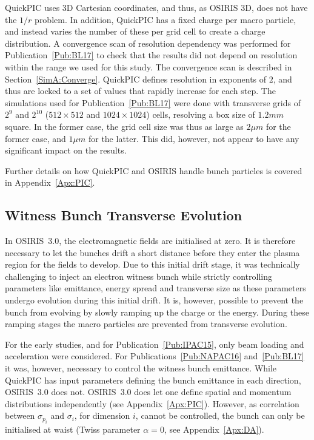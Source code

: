 QuickPIC uses 3D Cartesian coordinates, and thus, as OSIRIS 3D, does not have the $1/r$ problem.
In addition, QuickPIC has a fixed charge per macro particle, and instead varies the number of these per grid cell to create a charge distribution.
A convergence scan of resolution dependency was performed for Publication~\ref{Pub:BL17} to check that the results did not depend on resolution within the range we used for this study. The convergence scan is described in Section~\ref{SimA:Converge}.
QuickPIC defines resolution in exponents of $2$, and thus are locked to a set of values that rapidly increase for each step.
The simulations used for Publication~\ref{Pub:BL17} were done with transverse grids of $2^{9}$ and $2^{10}$ ($512 \times 512$ and $1024 \times 1024$) cells, resolving a box size of $1.2\unit{mm}$ square.
In the former case, the grid cell size was thus as large as $2\unit{\mu m}$ for the former case, and $1\unit{\mu m}$ for the latter.
This did, however, not appear to have any significant impact on the results.

Further details on how QuickPIC and OSIRIS handle bunch particles is covered in Appendix~\ref{Apx:PIC}.

\subsection{Witness Bunch Transverse Evolution}
\label{Sim:EBeam:TEvol}

In OSIRIS~3.0, the electromagnetic fields are initialised at zero.
It is therefore necessary to let the bunches drift a short distance before they enter the plasma region for the fields to develop.
Due to this initial drift stage, it was technically challenging to inject an electron witness bunch while strictly controlling parameters like emittance, energy spread and transverse size as these parameters undergo evolution during this initial drift.
It is, however, possible to prevent the bunch from evolving by slowly ramping up the charge or the energy.
During these ramping stages the macro particles are prevented from transverse evolution.

For the early studies, and for Publication~\ref{Pub:IPAC15}, only beam loading and acceleration were considered.
For Publications~\ref{Pub:NAPAC16} and~\ref{Pub:BL17} it was, however, necessary to control the witness bunch emittance.
While QuickPIC has input parameters defining the bunch emittance in each direction, OSIRIS~3.0 does not.
OSIRIS~3.0 does let one define spatial and momentum distributions independently (see Appendix~\ref{Apx:PIC}).
However, as correlation between $\sigma_{p_{i}}$ and $\sigma_{i}$, for dimension $i$, cannot be controlled, the bunch can only be initialised at waist (Twiss parameter $\alpha = 0$, see Appendix~\ref{Apx:DA}).

